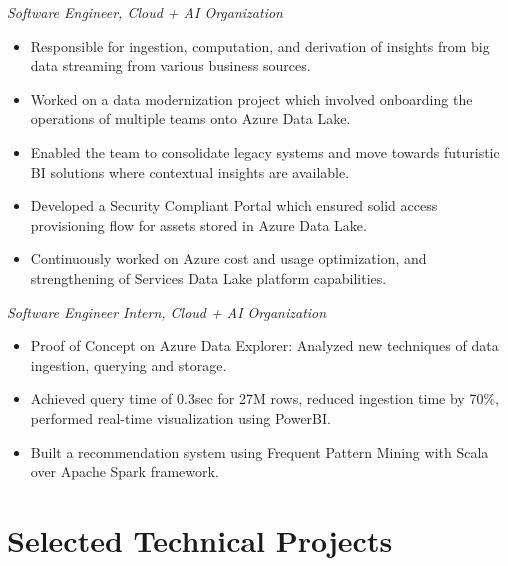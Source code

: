 \documentclass{article}
\begin{document}
\textit{Software Engineer, Cloud + AI Organization} \hfill 
\vspace{-2mm}
\begin{itemize}
\item Responsible for ingestion, computation, and derivation of insights from big data streaming from various business sources.
\item Worked on a data modernization project which involved onboarding the operations of multiple teams onto Azure Data Lake.
\item Enabled the team to consolidate legacy systems and move towards futuristic BI solutions where contextual insights are available. 
\item Developed a Security Compliant Portal which ensured solid access provisioning flow for assets stored in Azure Data Lake.
\item Continuously worked on Azure cost and usage optimization, and strengthening of Services Data Lake platform capabilities.
\end{itemize}

\vspace{-1mm}
\textit{Software Engineer Intern, Cloud + AI Organization}
\vspace{-2mm}
\begin{itemize}
\item Proof of Concept on Azure Data Explorer: Analyzed new techniques of data ingestion, querying and storage. 
\item Achieved query time of 0.3sec for 27M rows, reduced ingestion time by 70\%, performed real-time visualization using PowerBI.
\item Built a recommendation system using Frequent Pattern Mining with Scala over Apache Spark framework.
\end{itemize}





\section{Selected Technical Projects}
\end{document}

